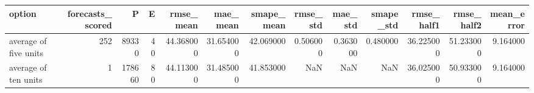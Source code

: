 \begin{tabular}{lrrrrrrrrrrrr}
\toprule
option & forecasts_scored & P & E & rmse_mean & mae_mean & smape_mean & rmse_std & mae_std & smape_std & rmse_half1 & rmse_half2 & mean_error \\
\midrule
average of five units & 252 & 89330 & 40 & 44.368000 & 31.654000 & 42.069000 & 0.506000 & 0.363000 & 0.480000 & 36.225000 & 51.233000 & 9.164000 \\
average of ten units & 1 & 178660 & 80 & 44.113000 & 31.485000 & 41.853000 & NaN & NaN & NaN & 36.025000 & 50.933000 & 9.164000 \\
\bottomrule
\end{tabular}
